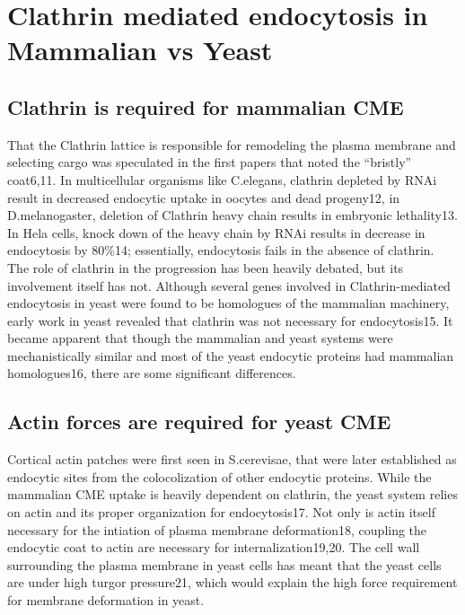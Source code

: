 	
\section{Clathrin mediated endocytosis in Mammalian vs Yeast}
		\subsection{Clathrin is required for mammalian CME}
That the Clathrin lattice is responsible for remodeling the plasma membrane and selecting cargo was speculated in the first papers that noted the “bristly” coat6,11.  In multicellular organisms like C.elegans, clathrin depleted by RNAi result in decreased endocytic uptake in oocytes and dead progeny12, in D.melanogaster, deletion of Clathrin heavy chain results in embryonic lethality13. In Hela cells, knock down of the heavy chain by RNAi results in decrease in endocytosis by 80\%14; essentially, endocytosis fails in the absence of clathrin. The role of clathrin in the progression has been heavily debated, but its involvement itself has not. Although several genes involved in Clathrin-mediated endocytosis in yeast were found to be homologues of the mammalian machinery, early work in yeast revealed that clathrin was not necessary for endocytosis15. It became apparent that though the mammalian and yeast systems were mechanistically similar and most of the yeast endocytic proteins had mammalian homologues16, there are some significant differences. 

		\subsection{Actin forces are required for yeast CME}
Cortical actin patches were first seen in S.cerevisae, that were later established as endocytic sites from the colocolization of other endocytic proteins. While the mammalian CME uptake is heavily dependent on clathrin, the yeast system relies on actin and its proper organization for endocytosis17. Not only is actin itself necessary for the intiation of plasma membrane deformation18, coupling the endocytic coat to actin are necessary for internalization19,20.  The cell wall surrounding the plasma membrane in yeast cells has meant that the yeast cells are under high turgor pressure21, which would explain the high force requirement for membrane deformation in yeast. 

	
